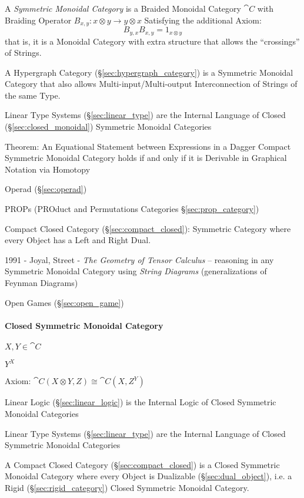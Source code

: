 A \emph{Symmetric Monoidal Category} is a Braided Monoidal Category $\cat{C}$
with Braiding Operator $B_{x,y} : x \otimes y \rightarrow y \otimes x$
Satisfying the additional Axiom:
\[
  B_{y,x} B_{x,y} = 1_{x \otimes y}
\]
that is, it is a Monoidal Category with extra structure that allows the
``crossings'' of Strings.

A Hypergraph Category (\S\ref{sec:hypergraph_category}) is a Symmetric Monoidal
Category that also allows Multi-input/Multi-output Interconnection of Strings of
the same Type.

Linear Type Systems (\S\ref{sec:linear_type}) are the Internal Language of
Closed (\S\ref{sec:closed_monoidal}) Symmetric Monoidal Categories

Theorem: An Equational Statement between Expressions in a Dagger
Compact Symmetric Monoidal Category holds if and only if it is
Derivable in Graphical Notation via Homotopy %

Operad (\S\ref{sec:operad})

\fist PROPs (PROduct and Permutations Categories \S\ref{sec:prop_category})

Compact Closed Category (\S\ref{sec:compact_closed}): Symmetric
Category where every Object has a Left and Right Dual.

1991 - Joyal, Street - \emph{The Geometry of Tensor Calculus} -- reasoning in
any Symmetric Monoidal Category using \emph{String Diagrams} (generalizations
of Feynman Diagrams)

Open Games (\S\ref{sec:open_game})



\paragraph{Closed Symmetric Monoidal Category}\hfill
\label{sec:closed_symmetric_monoidal}

$X, Y \in \cat{C}$

$Y^X$

Axiom: $\cat{C}(X \otimes Y, Z) \cong \cat{C}(X, Z^Y)$

Linear Logic (\S\ref{sec:linear_logic}) is the Internal Logic of
Closed Symmetric Monoidal Categories

Linear Type Systems (\S\ref{sec:linear_type}) are the Internal
Language of Closed Symmetric Monoidal Categories

A Compact Closed Category (\S\ref{sec:compact_closed}) is a Closed
Symmetric Monoidal Category where every Object is Dualizable
(\S\ref{sec:dual_object}), i.e. a Rigid (\S\ref{sec:rigid_category})
Closed Symmetric Monoidal Category.



